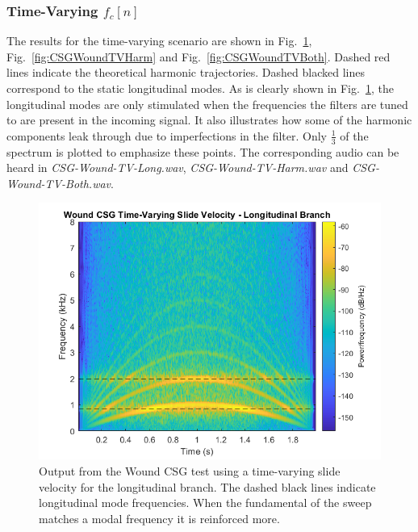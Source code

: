 \documentclass[../main.tex]{subfiles}
\begin{document}
\clearpage

\subsubsection{Time-Varying $f_c[n]$}
The results for the time-varying scenario are shown in Fig.~\ref{fig:CSGWoundTVLong}, Fig.~\ref{fig:CSGWoundTVHarm} and Fig.~\ref{fig:CSGWoundTVBoth}. Dashed red lines indicate the theoretical harmonic trajectories. Dashed blacked lines correspond to the static longitudinal modes. As is clearly shown in Fig.~\ref{fig:CSGWoundTVLong}, the longitudinal modes are only stimulated when the frequencies the filters are tuned to are present in the incoming signal. It also illustrates how some of the harmonic components leak through due to imperfections in the filter. Only $\frac{1}{3}$ of the spectrum is plotted to emphasize these points. The corresponding audio can be heard in \emph{CSG-Wound-TV-Long.wav}, \emph{CSG-Wound-TV-Harm.wav} and \emph{CSG-Wound-TV-Both.wav}.

\begin{figure}[hb]
    \centering
    \includegraphics[scale=.65]{./images/plots/CSG_Wound_TV_Long.png}
    \caption{Output from the Wound CSG test using a time-varying slide velocity for the longitudinal branch. The dashed black lines indicate longitudinal mode frequencies. When the fundamental of the sweep matches a modal frequency it is reinforced more.}
    \label{fig:CSGWoundTVLong}
\end{figure}
\end{document}

